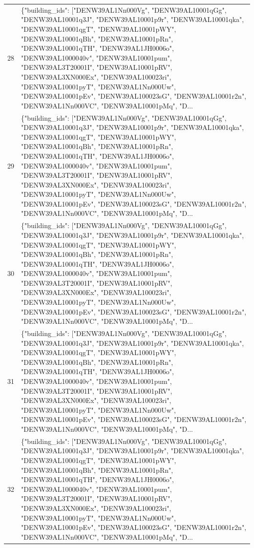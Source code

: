 \documentclass[a4paper,11pt]{article}
\begin{document}
\begin{table}[ht]
\begin{tabular}{r p{12cm}}
28 & \{"building\_ids": ["DENW39AL1Nn000Vg", "DENW39AL10001qGg", "DENW39AL10001q3J", "DENW39AL10001p9r", "DENW39AL10001qka", "DENW39AL10001qgT", "DENW39AL10001pWY", "DENW39AL10001qBh", "DENW39AL10001pRn", "DENW39AL10001qTH", "DENW39AL1JH0006o", "DENW39AL1000040v", "DENW39AL10001pum", "DENW39AL3T20001I", "DENW39AL10001pRV", "DENW39AL3XN000Ex", "DENW39AL100023ri", "DENW39AL10001pyT", "DENW39AL1Nn000Uw", "DENW39AL10001pEv", "DENW39AL100023sG", "DENW39AL10001r2n", "DENW39AL1Nn000VC", "DENW39AL10001pMq", "D... \\
29 & \{"building\_ids": ["DENW39AL1Nn000Vg", "DENW39AL10001qGg", "DENW39AL10001q3J", "DENW39AL10001p9r", "DENW39AL10001qka", "DENW39AL10001qgT", "DENW39AL10001pWY", "DENW39AL10001qBh", "DENW39AL10001pRn", "DENW39AL10001qTH", "DENW39AL1JH0006o", "DENW39AL1000040v", "DENW39AL10001pum", "DENW39AL3T20001I", "DENW39AL10001pRV", "DENW39AL3XN000Ex", "DENW39AL100023ri", "DENW39AL10001pyT", "DENW39AL1Nn000Uw", "DENW39AL10001pEv", "DENW39AL100023sG", "DENW39AL10001r2n", "DENW39AL1Nn000VC", "DENW39AL10001pMq", "D... \\
30 & \{"building\_ids": ["DENW39AL1Nn000Vg", "DENW39AL10001qGg", "DENW39AL10001q3J", "DENW39AL10001p9r", "DENW39AL10001qka", "DENW39AL10001qgT", "DENW39AL10001pWY", "DENW39AL10001qBh", "DENW39AL10001pRn", "DENW39AL10001qTH", "DENW39AL1JH0006o", "DENW39AL1000040v", "DENW39AL10001pum", "DENW39AL3T20001I", "DENW39AL10001pRV", "DENW39AL3XN000Ex", "DENW39AL100023ri", "DENW39AL10001pyT", "DENW39AL1Nn000Uw", "DENW39AL10001pEv", "DENW39AL100023sG", "DENW39AL10001r2n", "DENW39AL1Nn000VC", "DENW39AL10001pMq", "D... \\
31 & \{"building\_ids": ["DENW39AL1Nn000Vg", "DENW39AL10001qGg", "DENW39AL10001q3J", "DENW39AL10001p9r", "DENW39AL10001qka", "DENW39AL10001qgT", "DENW39AL10001pWY", "DENW39AL10001qBh", "DENW39AL10001pRn", "DENW39AL10001qTH", "DENW39AL1JH0006o", "DENW39AL1000040v", "DENW39AL10001pum", "DENW39AL3T20001I", "DENW39AL10001pRV", "DENW39AL3XN000Ex", "DENW39AL100023ri", "DENW39AL10001pyT", "DENW39AL1Nn000Uw", "DENW39AL10001pEv", "DENW39AL100023sG", "DENW39AL10001r2n", "DENW39AL1Nn000VC", "DENW39AL10001pMq", "D... \\
32 & \{"building\_ids": ["DENW39AL1Nn000Vg", "DENW39AL10001qGg", "DENW39AL10001q3J", "DENW39AL10001p9r", "DENW39AL10001qka", "DENW39AL10001qgT", "DENW39AL10001pWY", "DENW39AL10001qBh", "DENW39AL10001pRn", "DENW39AL10001qTH", "DENW39AL1JH0006o", "DENW39AL1000040v", "DENW39AL10001pum", "DENW39AL3T20001I", "DENW39AL10001pRV", "DENW39AL3XN000Ex", "DENW39AL100023ri", "DENW39AL10001pyT", "DENW39AL1Nn000Uw", "DENW39AL10001pEv", "DENW39AL100023sG", "DENW39AL10001r2n", "DENW39AL1Nn000VC", "DENW39AL10001pMq", "D... \\

\end{tabular}
\end{table}
\end{document}

